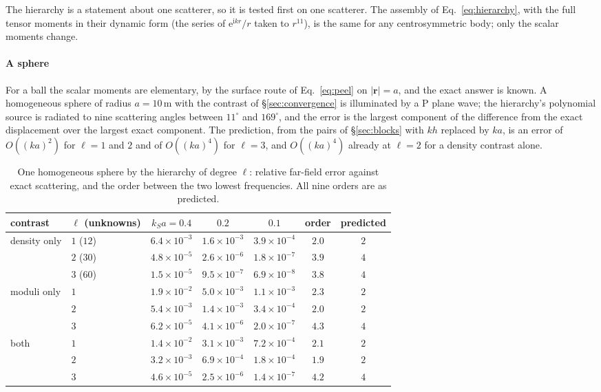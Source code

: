 \documentclass[preprint,review,12pt]{elsarticle}
\begin{document}
The hierarchy is a statement about one scatterer, so it is tested first on one scatterer. The assembly
of Eq.~\eqref{eq:hierarchy}, with the full tensor moments in their dynamic form (the series of
$\mathrm{e}^{\mathrm{i}kr}/r$ taken to $r^{11}$), is the same for any centrosymmetric body; only the
scalar moments change.

\paragraph{A sphere} For a ball the scalar moments are elementary, by the surface route of
Eq.~\eqref{eq:peel} on $|\mathbf r|=a$, and the exact answer is known. A homogeneous sphere of radius
$a=10$\,m with the contrast of \S\ref{sec:convergence} is illuminated by a P plane wave; the hierarchy's
polynomial source is radiated to nine scattering angles between $11^\circ$ and $169^\circ$, and the
error is the largest component of the difference from the exact displacement
\citep{YingTruell1956,PaoMow1973} over the largest exact component. The prediction, from the pairs of
\S\ref{sec:blocks} with $kh$ replaced by $ka$, is an error of $O((ka)^2)$ for $\ell=1$ and $2$ and of
$O((ka)^4)$ for $\ell=3$, and $O((ka)^4)$ already at $\ell=2$ for a density contrast alone.
\begin{table}[htbp]
\centering
\caption{One homogeneous sphere by the hierarchy of degree $\ell$: relative far-field error against
exact scattering, and the order between the two lowest frequencies. All nine orders are as
predicted.}\label{tab:hiersphere}
\small
\begin{tabular}{@{}llccccc@{}}
\toprule
contrast & $\ell$ (unknowns) & $k_Sa=0.4$ & $0.2$ & $0.1$ & order & predicted \\
\midrule
density only & $1$ ($12$) & $6.4\times10^{-3}$ & $1.6\times10^{-3}$ & $3.9\times10^{-4}$ & $2.0$ & $2$ \\
 & $2$ ($30$) & $4.8\times10^{-5}$ & $2.6\times10^{-6}$ & $1.8\times10^{-7}$ & $3.9$ & $4$ \\
 & $3$ ($60$) & $1.5\times10^{-5}$ & $9.5\times10^{-7}$ & $6.9\times10^{-8}$ & $3.8$ & $4$ \\
moduli only & $1$ & $1.9\times10^{-2}$ & $5.0\times10^{-3}$ & $1.1\times10^{-3}$ & $2.3$ & $2$ \\
 & $2$ & $5.4\times10^{-3}$ & $1.4\times10^{-3}$ & $3.4\times10^{-4}$ & $2.0$ & $2$ \\
 & $3$ & $6.2\times10^{-5}$ & $4.1\times10^{-6}$ & $2.0\times10^{-7}$ & $4.3$ & $4$ \\
both & $1$ & $1.4\times10^{-2}$ & $3.1\times10^{-3}$ & $7.2\times10^{-4}$ & $2.1$ & $2$ \\
 & $2$ & $3.2\times10^{-3}$ & $6.9\times10^{-4}$ & $1.8\times10^{-4}$ & $1.9$ & $2$ \\
 & $3$ & $4.6\times10^{-5}$ & $2.5\times10^{-6}$ & $1.4\times10^{-7}$ & $4.2$ & $4$ \\
\bottomrule
\end{tabular}
\end{table}
\end{document}
